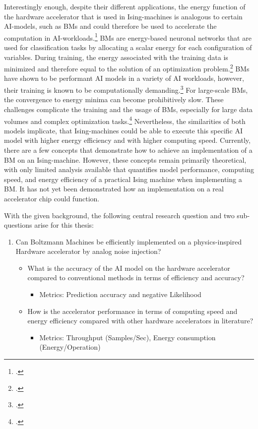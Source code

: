 Interestingly enough, despite their different applications, the energy function of the hardware accelerator that is used
in Ising-machines is analogous to certain AI-models, such as \ac{BM}s and could therefore be used to accelerate the computation in AI-workloads.\footcite[cf.][10]{caiHarnessingIntrinsicNoise2019}
\ac{BM}s are energy-based neuronal networks that are used for classification tasks by 
allocating a scalar energy for each configuration of variables.
During training, the energy associated with the training data is minimized and therefore equal to the solution of an optimization problem.\footcite[cf.][2]{nazmbojnordiMemristiveBoltzmannMachine2016} 
\ac{BM}s have shown to be performant AI models in a variety of AI workloads, however, their training is known to be computationally demanding.\footcite[cf.][1]{nazmbojnordiMemristiveBoltzmannMachine2016} 
For large-scale \ac{BM}s, the convergence to energy minima can become prohibitively slow.
These challenges complicate the training and the usage of \ac{BM}s, especially for large data volumes and complex optimization tasks.\footcite[cf.][2]{nazmbojnordiMemristiveBoltzmannMachine2016} 
Nevertheless, the similarities of both models implicate, that Ising-machines could be able to execute this 
specific AI model with higher energy efficiency and with higher computing speed.
Currently, there are a few concepts that demonstrate how to achieve an implementation of a \ac{BM} on an Ising-machine.
However, these concepts remain primarily theoretical, with only limited analysis available that quantifies model performance, computing speed, and energy efficiency of a practical Ising machine when implementing a \ac{BM}.
It has not yet been demonstrated how an implementation on a real accelerator chip could function.

With the given background, the following central research question and two sub-questions arise for this thesis:
\begin{enumerate}
    \item Can Boltzmann Machines be efficiently implemented on a physics-inspired Hardware accelerator by analog noise injection?
        \begin{itemize}
            \item What is the accuracy of the AI model on the hardware accelerator compared to conventional methods in terms of efficiency and accuracy?
                \begin{itemize}
                    \item Metrics: Prediction accuracy and negative Likelihood
                \end{itemize}
            \item How is the accelerator performance in terms of computing speed and energy efficiency compared with other hardware accelerators in literature?
                \begin{itemize}
                    \item Metrics: Throughput (Samples/Sec), Energy consumption (Energy/Operation)
                \end{itemize}
        \end{itemize}  
\end{enumerate}

